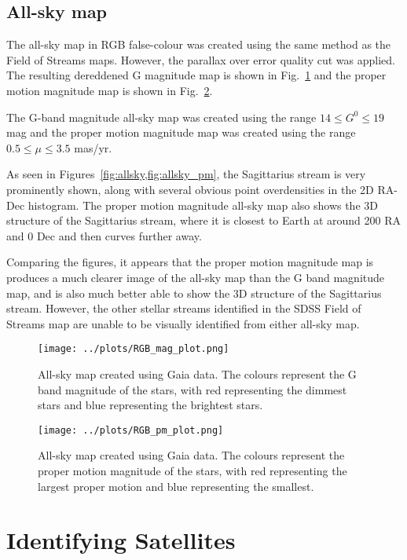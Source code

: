 \documentclass[11pt,a4paper]{article}
\begin{document}
\subsection{All-sky map}
\label{sec:allsky}
The all-sky map in RGB false-colour was created using the same method as the Field of Streams maps. However, the parallax over error quality cut was applied. The resulting dereddened G magnitude map is shown in Fig.~\ref{fig:allsky} and the proper motion magnitude map is shown in Fig.~\ref{fig:allsky_pm}.

The G-band magnitude all-sky map was created using the range $14 \le G^0 \le 19$ mag and the proper motion magnitude map was created using the range $0.5 \le \mu \le 3.5$ mas/yr.

As seen in Figures~\cref{fig:allsky,fig:allsky_pm}, the Sagittarius stream is very prominently shown, along with several obvious point overdensities in the 2D RA-Dec histogram. The proper motion magnitude all-sky map also shows the 3D structure of the Sagittarius stream, where it is closest to Earth at around 200 RA and 0 Dec and then curves further away.

Comparing the figures, it appears that the proper motion magnitude map is produces a much clearer image of the all-sky map than the G band magnitude map, and is also much better able to show the 3D structure of the Sagittarius stream. However, the other stellar streams identified in the SDSS Field of Streams map are unable to be visually identified from either all-sky map.

\begin{figure}
    \centering
    \texttt{[image: ../plots/RGB\_mag\_plot.png]}
    \caption{All-sky map created using Gaia data. The colours represent the G band magnitude of the stars, with red representing the dimmest stars and blue representing the brightest stars.}
    \label{fig:allsky}
\end{figure}
\begin{figure}
    \centering
    \texttt{[image: ../plots/RGB\_pm\_plot.png]}
    \caption{All-sky map created using Gaia data. The colours represent the proper motion magnitude of the stars, with red representing the largest proper motion and blue representing the smallest.}
    \label{fig:allsky_pm}
\end{figure}
\clearpage
\section{Identifying Satellites}
\label{sec:identifying}
\end{document}

